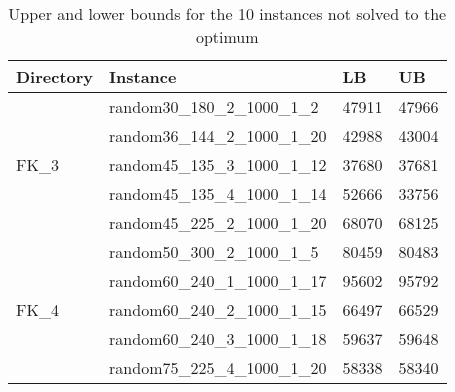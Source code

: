 \begin{table}[]
    \centering
    \begin{tabular}{@{}llll@{}}
        \toprule
        Directory              & Instance                      & LB    & UB    \\ \midrule
        \multirow{5}{*}{FK\_3} & random30\_180\_2\_1000\_1\_2  & 47911 & 47966 \\
        & random36\_144\_2\_1000\_1\_20 & 42988 & 43004 \\
        & random45\_135\_3\_1000\_1\_12 & 37680 & 37681 \\
        & random45\_135\_4\_1000\_1\_14 & 52666 & 33756 \\
        & random45\_225\_2\_1000\_1\_20 & 68070 & 68125 \\ \midrule
        \multirow{5}{*}{FK\_4} & random50\_300\_2\_1000\_1\_5  & 80459 & 80483 \\
        & random60\_240\_1\_1000\_1\_17 & 95602 & 95792 \\
        & random60\_240\_2\_1000\_1\_15 & 66497 & 66529 \\
        & random60\_240\_3\_1000\_1\_18 & 59637 & 59648 \\
        & random75\_225\_4\_1000\_1\_20 & 58338 & 58340 \\ \bottomrule
    \end{tabular}
    \caption{Upper and lower bounds for the 10 instances not solved to the optimum}
    \label{tab:exact_noopt}
\end{table}
